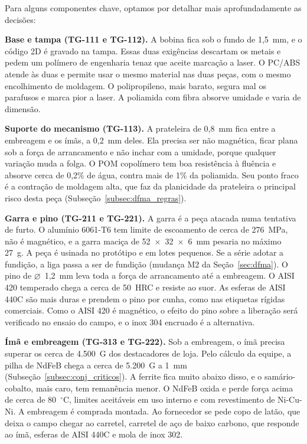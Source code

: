 Para alguns componentes chave, optamos por detalhar mais aprofundadamente as decisões:

\textbf{Base e tampa (TG-111 e TG-112).} A bobina fica sob o fundo de 1,5~mm, e o código 2D é gravado na tampa. Essas duas exigências descartam os metais e pedem um polímero de engenharia tenaz que aceite marcação a laser. O PC/ABS atende às duas e permite usar o mesmo material nas duas peças, com o mesmo encolhimento de moldagem. O polipropileno, mais barato, segura mal os parafusos e marca pior a laser. A poliamida com fibra absorve umidade e varia de dimensão.

\textbf{Suporte do mecanismo (TG-113).} A prateleira de 0,8~mm fica entre a embreagem e os ímãs, a 0,2~mm deles. Ela precisa ser não magnética, ficar plana sob a força de arrancamento e não inchar com a umidade, porque qualquer variação muda a folga. O POM copolímero tem boa resistência à fluência e absorve cerca de 0,2\% de água, contra mais de 1\% da poliamida. Seu ponto fraco é a contração de moldagem alta, que faz da planicidade da prateleira o principal risco desta peça (Subseção~\ref{subsec:dfma_regras}).

\textbf{Garra e pino (TG-211 e TG-221).} A garra é a peça atacada numa tentativa de furto. O alumínio 6061-T6 tem limite de escoamento de cerca de 276~MPa, não é magnético, e a garra maciça de 52~$\times$~32~$\times$~6~mm pesaria no máximo 27~g. A peça é usinada no protótipo e em lotes pequenos. Se a série adotar a fundição, a liga passa a ser de fundição (mudança M2 da Seção~\ref{sec:dfma}). O pino de $\varnothing$~1,2~mm leva toda a força de arrancamento até a embreagem. O AISI 420 temperado chega a cerca de 50~HRC e resiste ao suor. As esferas de AISI 440C são mais duras e prendem o pino por cunha, como nas etiquetas rígidas comerciais. Como o AISI 420 é magnético, o efeito do pino sobre a liberação será verificado no ensaio do campo, e o inox 304 encruado é a alternativa.

\textbf{Ímã e embreagem (TG-313 e TG-222).} Sob a embreagem, o ímã precisa superar os cerca de 4.500~G dos destacadores de loja. Pelo cálculo da equipe, a pilha de NdFeB chega a cerca de 5.200~G a 1~mm (Subseção~\ref{subsec:conj_criticos}). A ferrite fica muito abaixo disso, e o samário-cobalto, mais caro, tem remanência menor. O NdFeB oxida e perde força acima de cerca de 80~$^\circ$C, limites aceitáveis em uso interno e com revestimento de Ni-Cu-Ni. A embreagem é comprada montada. Ao fornecedor se pede copo de latão, que deixa o campo chegar ao carretel, carretel de aço de baixo carbono, que responde ao ímã, esferas de AISI 440C e mola de inox 302.

